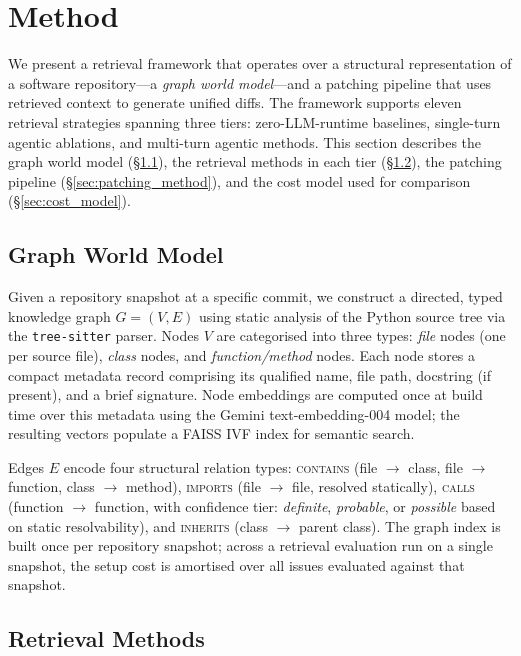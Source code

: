\section{Method}
\label{sec:method}

We present a retrieval framework that operates over a structural representation of a software repository---a \emph{graph world model}---and a patching pipeline that uses retrieved context to generate unified diffs. The framework supports eleven retrieval strategies spanning three tiers: zero-LLM-runtime baselines, single-turn agentic ablations, and multi-turn agentic methods. This section describes the graph world model (\S\ref{sec:graph_world_model}), the retrieval methods in each tier (\S\ref{sec:retrieval_methods}), the patching pipeline (\S\ref{sec:patching_method}), and the cost model used for comparison (\S\ref{sec:cost_model}).

\subsection{Graph World Model}
\label{sec:graph_world_model}

Given a repository snapshot at a specific commit, we construct a directed, typed knowledge graph $G = (V, E)$ using static analysis of the Python source tree via the \texttt{tree-sitter} parser. Nodes $V$ are categorised into three types: \emph{file} nodes (one per source file), \emph{class} nodes, and \emph{function/method} nodes. Each node stores a compact metadata record comprising its qualified name, file path, docstring (if present), and a brief signature. Node embeddings are computed once at build time over this metadata using the Gemini text-embedding-004 model; the resulting vectors populate a FAISS IVF index for semantic search.

Edges $E$ encode four structural relation types: \textsc{contains} (file $\to$ class, file $\to$ function, class $\to$ method), \textsc{imports} (file $\to$ file, resolved statically), \textsc{calls} (function $\to$ function, with confidence tier: \emph{definite}, \emph{probable}, or \emph{possible} based on static resolvability), and \textsc{inherits} (class $\to$ parent class). The graph index is built once per repository snapshot; across a retrieval evaluation run on a single snapshot, the setup cost is amortised over all issues evaluated against that snapshot.

\subsection{Retrieval Methods}
\label{sec:retrieval_methods}

